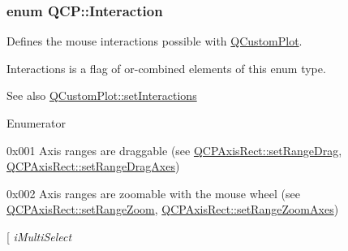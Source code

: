 \subsubsection[{Interaction}]{\setlength{\rightskip}{0pt plus 5cm}enum {\bf Q\+C\+P\+::\+Interaction}}\label{namespace_q_c_p_a2ad6bb6281c7c2d593d4277b44c2b037}
Defines the mouse interactions possible with \hyperlink{class_q_custom_plot}{Q\+Custom\+Plot}.

{\ttfamily Interactions} is a flag of or-\/combined elements of this enum type.

\begin{DoxySeeAlso}{See also}
\hyperlink{class_q_custom_plot_a5ee1e2f6ae27419deca53e75907c27e5}{Q\+Custom\+Plot\+::set\+Interactions} 
\end{DoxySeeAlso}
\begin{Desc}
\item[Enumerator]\par
\begin{description}
\item[{\em 
\hypertarget{namespace_q_c_p_a2ad6bb6281c7c2d593d4277b44c2b037a2c4432b9aceafb94000be8d1b589ef18}{}i\+Range\+Drag\label{namespace_q_c_p_a2ad6bb6281c7c2d593d4277b44c2b037a2c4432b9aceafb94000be8d1b589ef18}
}]{\ttfamily 0x001} Axis ranges are draggable (see \hyperlink{class_q_c_p_axis_rect_ae6aef2f7211ba6097c925dcd26008418}{Q\+C\+P\+Axis\+Rect\+::set\+Range\+Drag}, \hyperlink{class_q_c_p_axis_rect_a648cce336bd99daac4a5ca3e5743775d}{Q\+C\+P\+Axis\+Rect\+::set\+Range\+Drag\+Axes}) \item[{\em 
\hypertarget{namespace_q_c_p_a2ad6bb6281c7c2d593d4277b44c2b037abee1e94353525a636aeaf0ba32b72e14}{}i\+Range\+Zoom\label{namespace_q_c_p_a2ad6bb6281c7c2d593d4277b44c2b037abee1e94353525a636aeaf0ba32b72e14}
}]{\ttfamily 0x002} Axis ranges are zoomable with the mouse wheel (see \hyperlink{class_q_c_p_axis_rect_a7960a9d222f1c31d558b064b60f86a31}{Q\+C\+P\+Axis\+Rect\+::set\+Range\+Zoom}, \hyperlink{class_q_c_p_axis_rect_a9442cca2aa358405f39a64d51eca13d2}{Q\+C\+P\+Axis\+Rect\+::set\+Range\+Zoom\+Axes}) \item[{\em 
\hypertarget{namespace_q_c_p_a2ad6bb6281c7c2d593d4277b44c2b037aef673112c5067c3cf4cfddb62da7265d}{}i\+Multi\+Select\label{namespace_q_c_p_a2ad6bb6281c7c2d593d4277b44c2b037aef673112c5067c3cf4cfddb62da7265d}
}
\end{description}
\end{Desc}
